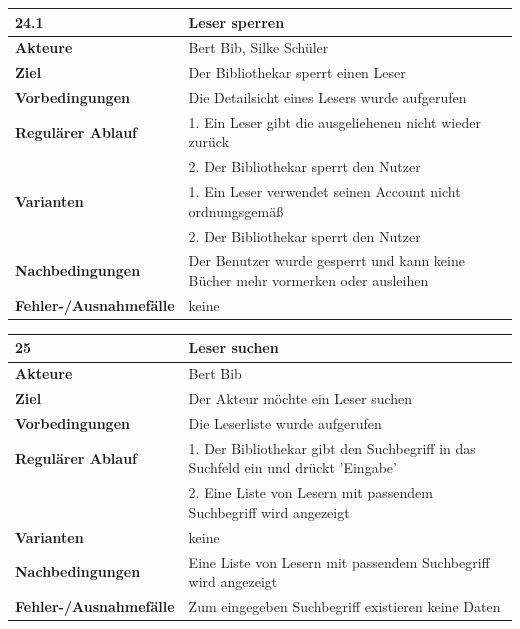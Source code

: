 \documentclass[fontsize=12pt,paper=a4,twoside]{scrartcl}
\begin{document}
\begin{table}[htbp]
\label{24.1}
\begin{tabular}{|l|p{10cm}|}
\hline 
\textbf{24.1} & \textbf{Leser sperren} \\ \hline
\textbf{Akteure} & Bert Bib, Silke Schüler\\ \hline
\textbf{Ziel} & Der Bibliothekar sperrt einen Leser \\ \hline
\textbf{Vorbedingungen} & Die Detailsicht eines Lesers wurde aufgerufen \\ \hline
\textbf{Regulärer Ablauf} & 
1. Ein Leser gibt die ausgeliehenen nicht wieder zurück\\
&2. Der Bibliothekar sperrt den Nutzer\\
\hline
\textbf{Varianten} & 
1. Ein Leser verwendet seinen Account nicht ordnungsgemäß\\
&2. Der Bibliothekar sperrt den Nutzer\\ \hline
\textbf{Nachbedingungen} & Der Benutzer wurde gesperrt und kann keine Bücher mehr vormerken oder ausleihen\\ \hline
\textbf{Fehler-/Ausnahmefälle} & keine\\
\hline
\end{tabular}
\end{table}

\begin{table}[htbp]
\label{25}
\begin{tabular}{|l|p{10cm}|}
\hline 
\textbf{25} & \textbf{Leser suchen} \\ \hline
\textbf{Akteure} & Bert Bib\\ \hline
\textbf{Ziel} & Der Akteur möchte ein Leser suchen \\ \hline
\textbf{Vorbedingungen} & Die Leserliste wurde aufgerufen \\ \hline
\textbf{Regulärer Ablauf} & 
1. Der Bibliothekar gibt den Suchbegriff in das Suchfeld ein und drückt 'Eingabe' \\
&2. Eine Liste von Lesern mit passendem Suchbegriff wird angezeigt\\
\hline
\textbf{Varianten} & 
keine \\ \hline
\textbf{Nachbedingungen} & Eine Liste von Lesern mit passendem Suchbegriff wird angezeigt\\ \hline
\textbf{Fehler-/Ausnahmefälle} & Zum eingegeben Suchbegriff existieren keine Daten\\
\hline
\end{tabular}
\end{table}
\end{document}
